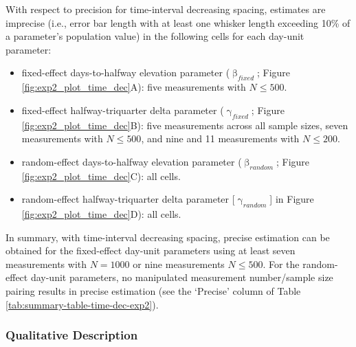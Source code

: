 \documentclass[
12pt, %
twoside,
english]{guelphthesis}
\begin{document}
With respect to precision for time-interval decreasing spacing, estimates are imprecise (i.e., error bar length with at least one whisker length exceeding 10\% of a parameter's population value) in the following cells for each day-unit parameter:
\begin{itemize}
\tightlist
\item
  fixed-effect days-to-halfway elevation parameter (\(\upbeta_{fixed}\); Figure \ref{fig:exp2_plot_time_dec}A): five measurements with \(N \le 500\).
\item
  fixed-effect halfway-triquarter delta parameter (\(\upgamma_{fixed}\); Figure \ref{fig:exp2_plot_time_dec}B): five measurements across all sample sizes, seven measurements with \(N \le 500\), and nine and 11 measurements with \(N \le 200\).
\item
  random-effect days-to-halfway elevation parameter (\(\upbeta_{random}\); Figure \ref{fig:exp2_plot_time_dec}C): all cells.
\item
  random-effect halfway-triquarter delta parameter {[}\(\upgamma_{random}\){]} in Figure \ref{fig:exp2_plot_time_dec}D): all cells.
\end{itemize}
In summary, with time-interval decreasing spacing, precise estimation can be obtained for the fixed-effect day-unit parameters using at least seven measurements with \(N = 1000\) or nine measurements \(N \le 500\). For the random-effect day-unit parameters, no manipulated measurement number/sample size pairing results in precise estimation (see the `Precise' column of Table \ref{tab:summary-table-time-dec-exp2}).

\hypertarget{qualitative-time-dec-exp2}{%
\subsubsection{Qualitative Description}\label{qualitative-time-dec-exp2}}
\end{document}
